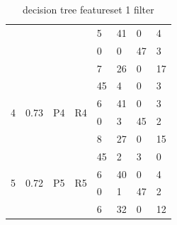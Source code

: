 \documentclass[USenglish]{ifimaster}  %
\begin{document}
\begin{table}[h]
{\begin{tabular}{@{}llllllll@{}}
\multicolumn{1}{l|}{} & \multicolumn{1}{l|}{} & \multicolumn{1}{l|}{} & \multicolumn{1}{l|}{} & \multicolumn{1}{l|}{5} & \multicolumn{1}{l|}{41} & \multicolumn{1}{l|}{0} & 4 \\ \cmidrule(l){5-8} 
\multicolumn{1}{l|}{} & \multicolumn{1}{l|}{} & \multicolumn{1}{l|}{} & \multicolumn{1}{l|}{} & \multicolumn{1}{l|}{0} & \multicolumn{1}{l|}{0} & \multicolumn{1}{l|}{47} & 3 \\ \cmidrule(l){5-8} 
\multicolumn{1}{l|}{} & \multicolumn{1}{l|}{} & \multicolumn{1}{l|}{} & \multicolumn{1}{l|}{} & \multicolumn{1}{l|}{7} & \multicolumn{1}{l|}{26} & \multicolumn{1}{l|}{0} & 17 \\ \midrule
\multicolumn{1}{l|}{\multirow{4}{*}{4}} & \multicolumn{1}{l|}{\multirow{4}{*}{0.73}} & \multicolumn{1}{l|}{\multirow{4}{*}{P4}} & \multicolumn{1}{l|}{\multirow{4}{*}{R4}} & \multicolumn{1}{l|}{45} & \multicolumn{1}{l|}{4} & \multicolumn{1}{l|}{0} & 3 \\ \cmidrule(l){5-8} 
\multicolumn{1}{l|}{} & \multicolumn{1}{l|}{} & \multicolumn{1}{l|}{} & \multicolumn{1}{l|}{} & \multicolumn{1}{l|}{6} & \multicolumn{1}{l|}{41} & \multicolumn{1}{l|}{0} & 3 \\ \cmidrule(l){5-8} 
\multicolumn{1}{l|}{} & \multicolumn{1}{l|}{} & \multicolumn{1}{l|}{} & \multicolumn{1}{l|}{} & \multicolumn{1}{l|}{0} & \multicolumn{1}{l|}{3} & \multicolumn{1}{l|}{45} & 2 \\ \cmidrule(l){5-8} 
\multicolumn{1}{l|}{} & \multicolumn{1}{l|}{} & \multicolumn{1}{l|}{} & \multicolumn{1}{l|}{} & \multicolumn{1}{l|}{8} & \multicolumn{1}{l|}{27} & \multicolumn{1}{l|}{0} & 15 \\ \midrule
\multicolumn{1}{l|}{\multirow{4}{*}{5}} & \multicolumn{1}{l|}{\multirow{4}{*}{0.72}} & \multicolumn{1}{l|}{\multirow{4}{*}{P5}} & \multicolumn{1}{l|}{\multirow{4}{*}{R5}} & \multicolumn{1}{l|}{45} & \multicolumn{1}{l|}{2} & \multicolumn{1}{l|}{3} & 0 \\ \cmidrule(l){5-8} 
\multicolumn{1}{l|}{} & \multicolumn{1}{l|}{} & \multicolumn{1}{l|}{} & \multicolumn{1}{l|}{} & \multicolumn{1}{l|}{6} & \multicolumn{1}{l|}{40} & \multicolumn{1}{l|}{0} & 4 \\ \cmidrule(l){5-8} 
\multicolumn{1}{l|}{} & \multicolumn{1}{l|}{} & \multicolumn{1}{l|}{} & \multicolumn{1}{l|}{} & \multicolumn{1}{l|}{0} & \multicolumn{1}{l|}{1} & \multicolumn{1}{l|}{47} & 2 \\ \cmidrule(l){5-8} 
\multicolumn{1}{l|}{} & \multicolumn{1}{l|}{} & \multicolumn{1}{l|}{} & \multicolumn{1}{l|}{} & \multicolumn{1}{l|}{6} & \multicolumn{1}{l|}{32} & \multicolumn{1}{l|}{0} & 12 \\ \bottomrule
\end{tabular}%
}
\caption{decision tree featureset 1 filter
}
\label{dt4}
\end{table}
\FloatBarrier
\end{document}
